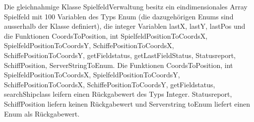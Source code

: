 Die gleichnahmige Klasse SpielfeldVerwaltung besitz ein \newline eindimensionales Array Spielfeld mit 100 Variablen des Typs Enum
(die dazugehörigen Enums sind ausserhalb der Klasse definiert), die integer Variablen lastX, lastY, lastPos und die Funktionen CoordsToPosition, int SpielfeldPositionToCoordsX, SpielfeldPositionToCoordsY, SchiffePositionToCoordsX, SchiffePositionToCoordsY, getFieldstatus, getLastFieldStatus, Statusreport, SchiffPosition, ServerStringToEnum.\newline 
Die Funktionen CoordsToPosition, int SpielfeldPositionToCoordsX, SpielfeldPositionToCoordsY, SchiffePositionToCoordsX, SchiffePositionToCoordsY, getFieldstatus, searchShipclass leifern einen Rückgabewert des Typs Integer. 
Statusreport, SchiffPosition liefern keinen Rückgabewert und Serverstring toEnum liefert einen Enum als Rückgabewert. 
